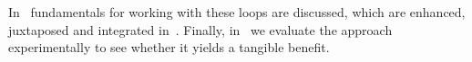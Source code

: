 In~ fundamentals for working with these loops are discussed, which are enhanced, juxtaposed and integrated in~.
Finally, in~ we evaluate the approach experimentally to see whether it yields a tangible benefit.



